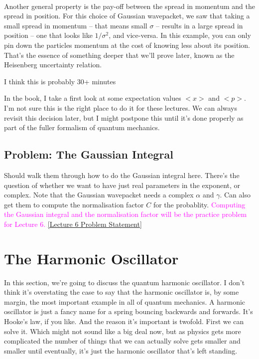 \documentclass[12pt]{article}
\newcommand\para{\paragraph{}}
\newcommand{\alyssa}{\textcolor{magenta}}
\begin{document}
\para
Another general property is the pay-off between the spread in momentum and the spread in position. For this choice of Gaussian wavepacket, we saw that taking a small spread in momentum -- that means small $\sigma$ -- results in a large spread in position -- one that looks like $1/\sigma^2$, and vice-versa. In this example, you can only pin down the particles momentum at the cost of knowing less about its position. That's the essence of something deeper that we'll prove later, known as the Heisenberg uncertainty relation. 

{\color{red} I think this is probably 30+ minutes}

{\color{blue} In the book, I take a first look at some expectation values $<x>$ and $<p>$. I'm not sure this is the right place to do it for these lectures. We can always revisit this decision later, but I might postpone this until it's done properly as part of the fuller formalism of quantum mechanics.}


\subsection{Problem: The Gaussian Integral}

{\color{blue}Should walk them through how to do the Gaussian integral here. There's the question of whether we want to have just real parameters in the exponent, or complex. Note that the Gaussian wavepacket needs a complex $\alpha$ and $\gamma$. Can also get them to compute the normalisation factor $C$ for the probablity. } \alyssa{Computing the Gaussian integral and the normalisation factor will be the practice problem for Lecture 6.} \href{https://drive.google.com/file/d/1xDxOLH_lZp7oQLy4JM21t9CUUGyPKqXj/view?usp=drive_link}{[Lecture 6 Problem Statement]}


\newpage
\section{The Harmonic Oscillator}

In this section, we're going to discuss the quantum harmonic oscillator. I don't think it's overstating the case to say that the harmonic oscillator is, by some margin, the most important example in all of quantum mechanics.  A harmonic oscillator is just a fancy name for a spring bouncing backwards and forwards. It's Hooke's law, if you like. And the reason it's important is twofold. First we can solve it. Which might not sound like a big deal now, but as physics gets more complicated the number of things that we can actually solve gets smaller and smaller until eventually, it's just the harmonic oscillator that's left standing. 
\end{document}

